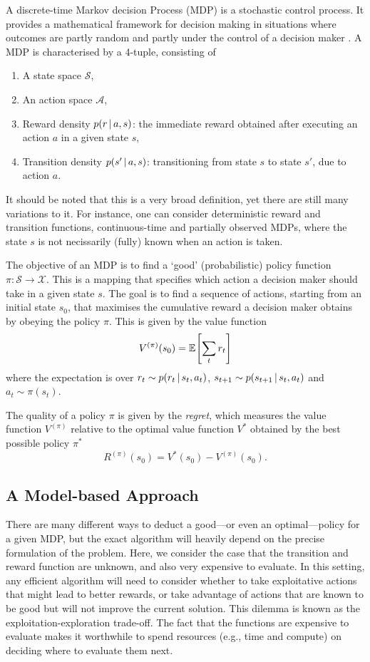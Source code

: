 A discrete-time Markov decision Process (MDP) is a stochastic control process. It provides a mathematical framework for decision making in situations where outcomes are partly random and partly under the control of a decision maker \citep{sutton2018reinforcement}. A MDP is characterised by a 4-tuple, consisting of
\begin{enumerate}
    \item A state space $\mathcal{S}$,
    \item An action space $\mathcal{A}$,
    \item Reward density $p(r \,|\, a, s)$: the immediate reward obtained after executing an action $a$ in a given state $s$,
    \item Transition density $p(s' \,|\, a, s)$: transitioning from state $s$ to state $s'$, due to action $a$.
\end{enumerate}
It should be noted that this is a very broad definition, yet there are still many variations to it. For instance, one can consider deterministic reward and transition functions, continuous-time and partially observed MDPs, where the state $s$ is not necissarily (fully) known when an action is taken.

The objective of an MDP is to find a `good' (probabilistic) policy function $\pi:\mathcal{S} \rightarrow \mathcal{X}$. This is a mapping that specifies which action a decision maker should take in a given state $s$. The goal is to find a sequence of actions, starting from an initial state $s_0$, that maximises the cumulative reward a decision maker obtains by obeying the policy $\pi$. This is given by the value function
\begin{equation}
    V^{(\pi)}(s_0) = \Exp{}{\sum_t r_t}
\end{equation}
where the expectation is over $r_t \sim p(r_t \,|\, s_t, a_t)$, $s_{t+1} \sim p(s_{t+1} \,|\, s_t, a_t)$ and $a_t \sim \pi(s_t)$.

The quality of a policy $\pi$ is given by the \emph{regret}, which measures the value function $V^{(\pi)}$ relative to the optimal value function $V^{*}$ obtained by the best possible policy $\pi^*$
\begin{equation}
    R^{(\pi)}(s_0) = V^*(s_0) - V^{(\pi)}(s_0). 
\end{equation}

\subsection{A Model-based Approach}
There are many different ways to deduct a good---or even an optimal---policy for a given MDP, but the exact algorithm will heavily depend on the precise formulation of the problem. Here, we consider the case that the transition and reward function are unknown, and also very expensive to evaluate. In this setting, any efficient algorithm will need to consider whether to take exploitative actions that might lead to better rewards, or take advantage of actions that are known to be good but will not improve the current solution. This dilemma is known as the exploitation-exploration trade-off. The fact that the functions are expensive to evaluate makes it worthwhile to spend resources (e.g., time and compute) on deciding where to evaluate them next.

